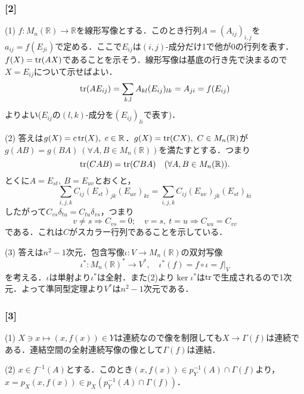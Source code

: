 \documentclass[a4j]{ltjsarticle}
\newcommand{\Rset}{\mathbb{R}}
\newcommand{\1}{\mathbbm{1}}
\numberwithin{equation}{section}
\theoremstyle{definition}
\begin{document}
\subsubsection*{[2]}
(1) $f\colon M_n(\Rset)\to\Rset$を線形写像とする．このとき行列$A=(A_{ij})_{i,j}$を$a_{ij}=f(E_{ji})$で定める．ここで$E_{ij}$は$(i,j)$-成分だけ1で他が0の行列を表す．$f(X)=\tr(AX)$であることを示そう．線形写像は基底の行き先で決まるので$X=E_{ij}$について示せばよい．
\begin{equation}
    \tr(AE_{ij})=\sum_{k,l}A_{kl}(E_{ij})_{lk}=A_{ji}=f(E_{ij})
\end{equation}
よりよい($E_{ij}$の$(l,k)$-成分を$(E_{ij})_{li}$で表す)．

(2) 答えは$g(X)=c\tr(X),\ c\in\Rset$．$g(X)=\tr(CX),\ C\in M_n(\Rset)$が$g(AB)=g(BA)\ (\forall A,B\in M_n(\Rset))$を満たすとする．つまり
\begin{equation}
    \tr(CAB)=\tr(CBA)\quad (\forall A,B\in M_n(\Rset)).
\end{equation}
とくに$A=E_{st},\ B=E_{uv}$とおくと，
\begin{equation}
    \sum_{i,j,k}C_{ij}(E_{st})_{jk}(E_{uv})_{ki}=\sum_{i,j,k}C_{ij}(E_{uv})_{jk}(E_{st})_{ki}
\end{equation}
したがって$C_{vs}\delta_{tu}=C_{tu}\delta_{vs}$，つまり
\begin{equation}
    v\neq s\Longrightarrow C_{vs}=0;\quad v=s,\ t=u\Longrightarrow C_{uu}=C_{vv}
\end{equation}
である．これは$C$がスカラー行列であることを示している．

(3) 答えは$n^2-1$次元．包含写像$\iota\colon V\to M_n(\Rset)$の双対写像
\begin{equation}
    \iota^\ast\colon M_n(\Rset)^\ast\to V^\ast,\quad \iota^\ast(f)=f\circ \iota=f|_{V}  
\end{equation}
を考える．$\iota$は単射より$\iota^\ast$は全射．また(2)より$\ker\iota^\ast$は$\tr$で生成されるので1次元．よって準同型定理より$V^\ast$は$n^2-1$次元である．

\subsubsection*{[3]}
(1) $X\ni x\mapsto(x,f(x))\in Y$は連続なので像を制限しても$X\to \Gamma(f)$は連続である．連結空間の全射連続写像の像として$\Gamma(f)$は連結．

(2) $x\in f^{-1}(A)$とする．このとき$(x,f(x))\in p_Y^{-1}(A)\cap\Gamma(f)$より，$x=p_X(x,f(x))\in p_X(p_Y^{-1}(A)\cap \Gamma(f))$．
\end{document}
